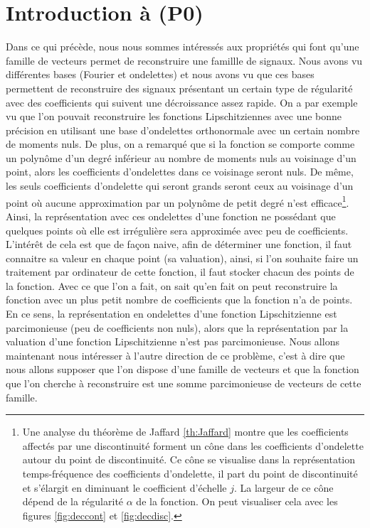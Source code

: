 \section{Introduction à (P0)}
Dans ce qui précède, nous nous sommes intéressés aux propriétés qui font qu'une famille de vecteurs permet de reconstruire une famillle de signaux.
Nous avons vu différentes bases (Fourier et ondelettes) et nous avons vu que ces bases permettent de reconstruire des signaux présentant un certain type de régularité avec des coefficients qui suivent une décroissance assez rapide.
\newline
On a par exemple vu que l'on pouvait reconstruire les fonctions Lipschitziennes avec une bonne précision en utilisant une base d'ondelettes orthonormale avec un certain nombre de moments nuls.
De plus, on a remarqué que si la fonction se comporte comme un polynôme d'un degré inférieur au nombre de moments nuls au voisinage d'un point, alors les coefficients d'ondelettes dans ce voisinage seront nuls.
De même, les seuls coefficients d'ondelette qui seront grands seront ceux au voisinage d'un point où aucune approximation par un polynôme de petit degré n'est efficace\footnote{Une analyse du théorème de Jaffard \ref{th:Jaffard} montre que les coefficients affectés par une discontinuité forment un cône dans les coefficients d'ondelette autour du point de discontinuité. Ce cône se visualise dans la représentation temps-fréquence des coefficients d'ondelette, il part du point de discontinuité et s'élargit en diminuant le coefficient d'échelle $j$. La largeur de ce cône dépend de la régularité $\alpha$ de la fonction. On peut visualiser cela avec les figures \ref{fig:deccont} et \ref{fig:decdisc}.}.
Ainsi, la représentation avec ces ondelettes d'une fonction ne possédant que quelques points où elle est irrégulière sera approximée avec peu de coefficients.
L'intérêt de cela est que de façon naive, afin de déterminer une fonction, il faut connaitre sa valeur en chaque point (sa valuation), ainsi, si l'on souhaite faire un traitement par ordinateur de cette fonction, il faut stocker chacun des points de la fonction.
Avec ce que l'on a fait, on sait qu'en fait on peut reconstruire la fonction avec un plus petit nombre de coefficients que la fonction n'a de points.
En ce sens, la représentation en ondelettes d'une fonction Lipschitzienne est parcimonieuse (peu de coefficients non nuls), alors que la représentation par la valuation d'une fonction Lipschitzienne n'est pas parcimonieuse.
\newline
Nous allons maintenant nous intéresser à l'autre direction de ce problème, c'est à dire que nous allons supposer que l'on dispose d'une famille de vecteurs et que la fonction que l'on cherche à reconstruire est une somme parcimonieuse de vecteurs de cette famille.
